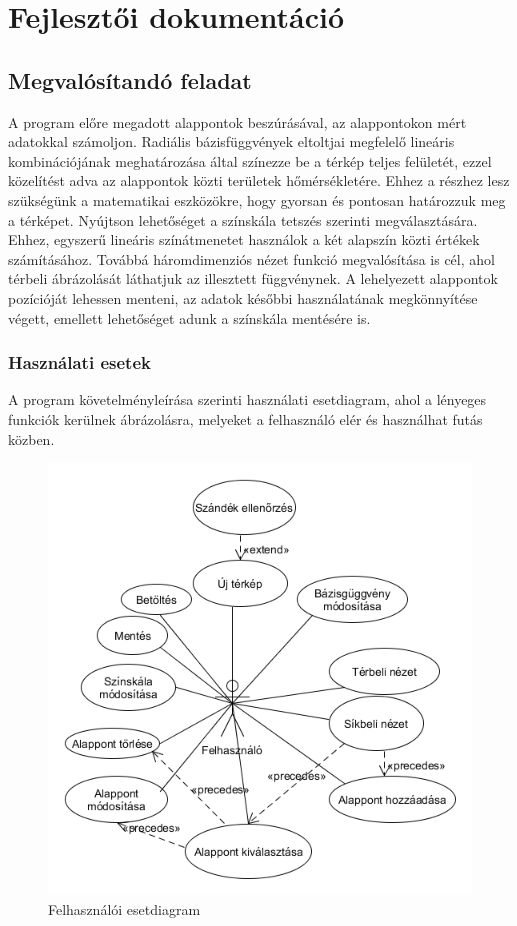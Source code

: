 \chapter{Fejlesztői dokumentáció}

	\section{Megvalósítandó feladat}
	
	A program előre megadott alappontok beszúrásával, az alappontokon mért adatokkal számoljon. Radiális bázisfüggvények eltoltjai megfelelő lineáris kombinációjának meghatározása által színezze be a térkép teljes felületét, ezzel közelítést adva az alappontok közti területek hőmérsékletére. Ehhez a részhez lesz szükségünk a matematikai eszközökre, hogy gyorsan és pontosan határozzuk meg a térképet. Nyújtson lehetőséget a színskála tetszés szerinti megválasztására. Ehhez, egyszerű lineáris színátmenetet használok a két alapszín közti értékek számításához. Továbbá háromdimenziós nézet funkció megvalósítása is cél, ahol térbeli ábrázolását láthatjuk az illesztett függvénynek. A lehelyezett alappontok pozícióját lehessen menteni, az adatok későbbi használatának megkönnyítése végett, emellett lehetőséget adunk a színskála mentésére is.
	
	\subsection{Használati esetek}
	
	A program követelményleírása szerinti használati esetdiagram, ahol a lényeges funkciók kerülnek ábrázolásra, melyeket a felhasználó elér és használhat futás közben.
	\begin{figure}[ht]
		\centering
		\includegraphics[scale=0.9]{developer/hasznalati_esetdiagram.png}
		\caption{Felhasználói esetdiagram}
	\end{figure}
	
